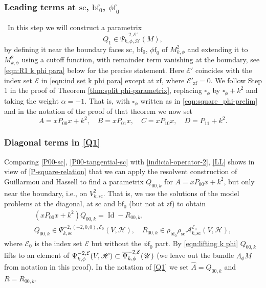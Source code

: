 \documentclass[11pt]{article}
\newcommand{\ie}{i.e.,\xspace}
\numberwithin{equation}{section}
\theoremstyle{plain}
\theoremstyle{definition}
\newcommand{\Hmath}{{\mathscr{H}}}
\newcommand\calA{{\mathcal A}}
\newcommand\calE{{\mathcal E}}
\newcommand{\phif}{{\phi\mathrm{f}}}
\newcommand{\bbf}{{\mathrm{bf}}}
\newcommand{\ssc}{{\mathrm{sc}}}
\newcommand{\zf}{{\mathrm{zf}}}
\DeclareMathOperator{\Id}{Id}
\newcommand{\Psibar}{\overline{\Psi}}
\begin{document}
\subsubsection{Leading terms at $\ssc$, $\bbf_0$, $\phif_0$} \
In this step we will construct a parametrix
\begin{equation}
\label{eqn:Q_1 k phi para}
Q_1\in \Psibar_{k,\phi,\mathscr{H}}^{-2,\calE'} (M),
\end{equation}
by defining it near the boundary faces $\ssc$, $\bbf_0$, $\phif_0$ of $M^2_{k,\phi}$ and extending it to $M^2_{k,\phi}$ using a cutoff function,
with remainder term vanishing at the boundary, see \eqref{eqn:R1 k phi para} below for the precise
statement. Here $\calE'$ coincides with the index set $\calE$ in
\eqref{eqn:ind set k phi para} except at $\zf$, where $\calE'_\zf=0$.
We follow Step 1 in the proof of Theorem \ref{thm:split phi-parametrix},
replacing $\square_\phi$ by $\square_\phi+k^2$ and taking the weight $\alpha=-1$.
That is, with $\square_\phi$ written as in \eqref{eqn:square_phi-prelim} and in the
notation of the proof of that theorem we now set
\[
A=xP_{00}x+k^2, \quad B=xP_{01}x, \quad C=xP_{10}x, \quad D=P_{11}+k^2.
\]

\subsubsection*{Diagonal terms in \eqref{Q1}}
Comparing \eqref{P00-sc}, \eqref{P00-tangential-sc} with \eqref{indicial-operator-2}, \eqref{LL}
shows in view of \eqref{P-square-relation} that we can apply the
resolvent construction of Guillarmou and Hassell to find a parametrix $Q_{00,k}$ for $A=xP_{00}x+k^2$,
but only near the boundary, \ie on $V^2_{k,\ssc}$. That is, we use the solutions of the model
problems at the diagonal, at $\ssc$ and $\bbf_0$ (but not at $\zf$) to obtain
\begin{equation}
\begin{gathered}
(xP_{00}x+k^2)Q_{00,k} = \Id-R_{00,k},\\
Q_{00,k}\in\Psi_{k,\ssc}^{-2,(-2,0,0),\calE_0}(V,\Hmath), \quad
R_{00,k}\in \rho_{\bbf_0} \rho_\ssc\calA_{k,\ssc}^{\calE_0}(V,\Hmath),
\end{gathered}
\end{equation}
where $\calE_0$ is the index set $\calE$ but without the $\phif_0$ part.
By \eqref{eqn:lifting k phi} $Q_{00,k}$ lifts to an element of $\Psi^{-2,\calE}_{k,\phi}(V,\Hmath)\subset\Psibar^{-2,\calE}_{k,\phi}(\U)$ (we leave out the bundle $\Lambda_\phi M$ from notation in this proof).
In the notation of \eqref{Q1} we set $\widehat{A}= Q_{00,k}$ and $R = R_{00,k}$.
\end{document}
